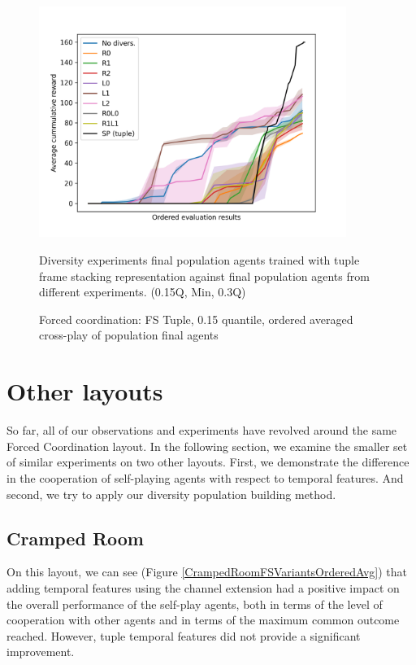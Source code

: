 \begin{figure}[!ht]
    \centering
    \includegraphics*[width=10cm]{../img/FinalPopFinalPopFsTupleQ15.png}

    \caption{Forced coordination: FS Tuple, 0.15 quantile, ordered averaged cross-play of population final agents}
    \label{FinalPopFinalPopFsTupleQ15}
    \medskip
    \small 
    Diversity experiments final population agents trained with tuple frame stacking representation against final population agents from different experiments.
    (0.15Q, Min, 0.3Q)


\end{figure}

\newpage

\section{Other layouts}
So far, all of our observations and experiments have revolved around the same Forced Coordination layout.
In the following section, we examine the smaller set of similar experiments on two other layouts.
First, we demonstrate the difference in the cooperation of self-playing agents with respect to temporal features.
And second, we try to apply our diversity population building method.



\subsection{Cramped Room}
On this layout, we can see (Figure \ref{CrampedRoomFSVariantsOrderedAvg}) that adding temporal features using the channel extension had a positive impact on the overall performance of the self-play agents, both in terms of the level of cooperation with other agents and in terms of the maximum common outcome reached.
However, tuple temporal features did not provide a significant improvement.

